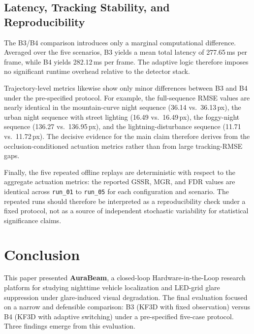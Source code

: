 \documentclass[pdflatex,sn-mathphys-num]{sn-jnl}%
\theoremstyle{thmstyleone}%
\theoremstyle{thmstyletwo}%
\theoremstyle{thmstylethree}%
\begin{document}
\FloatBarrier

\subsection{Latency, Tracking Stability, and Reproducibility}
\label{subsec:res_runtime}

The B3/B4 comparison introduces only a marginal computational
difference. Averaged over the five scenarios, B3 yields a mean total
latency of 277.65\,ms per frame, while B4 yields 282.12\,ms per frame.
The adaptive logic therefore imposes no significant runtime overhead relative to the detector stack.

Trajectory-level metrics likewise show only minor differences between
B3 and B4 under the pre-specified protocol. For example, the full-sequence
RMSE values are nearly identical in the mountain-curve night sequence (36.14 vs.\
36.13\,px), the urban night sequence with street lighting (16.49 vs.\ 16.49\,px),
the foggy-night sequence (136.27 vs.\ 136.95\,px), and the lightning-disturbance sequence
(11.71 vs.\ 11.72\,px). The decisive evidence for the main claim
therefore derives from the occlusion-conditioned actuation metrics rather
than from large tracking-RMSE gaps.

Finally, the five repeated offline replays are deterministic with
respect to the aggregate actuation metrics: the reported GSSR, MGR, and
FDR values are identical across \texttt{run\_01} to \texttt{run\_05} for
each configuration and scenario. The repeated runs should
therefore be interpreted as a reproducibility check under a fixed
protocol, not as a source of independent stochastic variability for
statistical significance claims.

\section{Conclusion}
\label{sec:conclusion}

This paper presented \textbf{AuraBeam}, a closed-loop Hardware-in-the-Loop research platform for studying nighttime vehicle localization and
LED-grid glare suppression under glare-induced visual degradation. The
final evaluation focused on a narrow and defensible comparison:
B3 (KF3D with fixed observation) versus B4 (KF3D with adaptive
switching) under a pre-specified five-case protocol. Three findings emerge from this evaluation.
\end{document}
